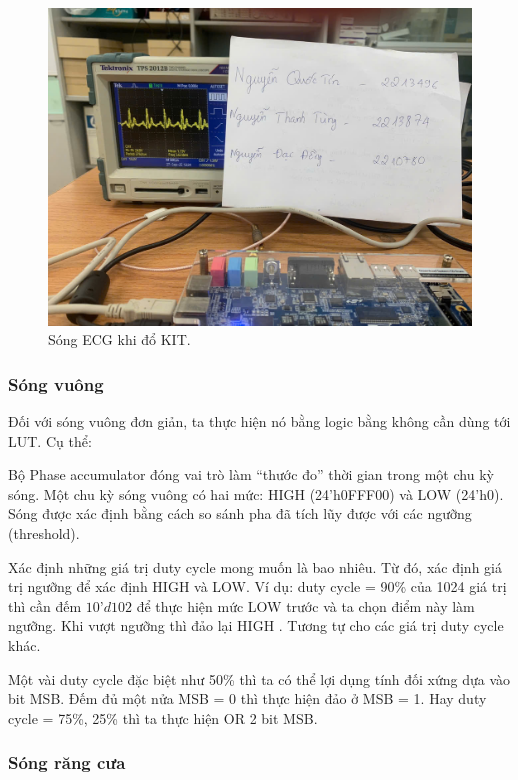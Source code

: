 \begin{figure}[H]
	\centering
	\includegraphics[width=\linewidth]{./my-chapters/my-images/Gen_wave/hinh3.jpg}
	\caption{Sóng ECG khi đổ KIT.}
	\label{f: ecg wave}
\end{figure}

\subsubsection{Sóng vuông}

Đối với sóng vuông đơn giản, ta thực hiện nó bằng logic bằng không cần dùng tới LUT. Cụ thể:

Bộ Phase accumulator đóng vai trò làm “thước đo” thời gian trong một chu kỳ sóng. Một chu kỳ sóng vuông có hai mức: HIGH (24'h0FFF00) và LOW (24'h0). Sóng được xác định bằng cách so sánh pha đã tích lũy được với các ngưỡng (threshold).

Xác định những giá trị duty cycle mong muốn là bao nhiêu. Từ đó, xác định giá trị ngưỡng để xác định HIGH và LOW. Ví dụ: duty cycle = 90\% của 1024 giá trị thì cần đếm $ 10’d102 $ để thực hiện mức LOW trước và ta chọn điểm này làm ngưỡng. Khi vượt ngưỡng thì đảo lại HIGH . Tương tự cho các giá trị duty cycle khác.

Một vài duty cycle đặc biệt như 50\% thì ta có thể lợi dụng tính đối xứng dựa vào bit MSB. Đếm đủ một nửa MSB = 0 thì thực hiện đảo ở MSB = 1. Hay duty cycle = 75\%, 25\% thì ta thực hiện OR 2 bit MSB.

\subsubsection{Sóng răng cưa}

